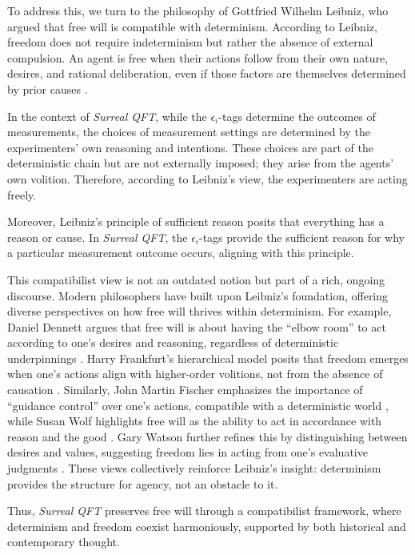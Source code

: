 \documentclass{article}
\begin{document}
To address this, we turn to the philosophy of Gottfried Wilhelm Leibniz, who argued that free will is compatible with determinism. According to Leibniz, freedom does not require indeterminism but rather the absence of external compulsion. An agent is free when their actions follow from their own nature, desires, and rational deliberation, even if those factors are themselves determined by prior causes \cite{Leibniz1686}.

In the context of \textit{Surreal QFT}, while the \(\epsilon_i\)-tags determine the outcomes of measurements, the choices of measurement settings are determined by the experimenters' own reasoning and intentions. These choices are part of the deterministic chain but are not externally imposed; they arise from the agents' own volition. Therefore, according to Leibniz's view, the experimenters are acting freely.

Moreover, Leibniz's principle of sufficient reason posits that everything has a reason or cause. In \textit{Surreal QFT}, the \(\epsilon_i\)-tags provide the sufficient reason for why a particular measurement outcome occurs, aligning with this principle.

This compatibilist view is not an outdated notion but part of a rich, ongoing discourse. Modern philosophers have built upon Leibniz's foundation, offering diverse perspectives on how free will thrives within determinism. For example, Daniel Dennett argues that free will is about having the ``elbow room'' to act according to one's desires and reasoning, regardless of deterministic underpinnings \cite{Dennett1984}. Harry Frankfurt's hierarchical model posits that freedom emerges when one's actions align with higher-order volitions, not from the absence of causation \cite{Frankfurt1971}. Similarly, John Martin Fischer emphasizes the importance of ``guidance control'' over one's actions, compatible with a deterministic world \cite{Fischer1994}, while Susan Wolf highlights free will as the ability to act in accordance with reason and the good \cite{Wolf1990}. Gary Watson further refines this by distinguishing between desires and values, suggesting freedom lies in acting from one's evaluative judgments \cite{Watson1975}. These views collectively reinforce Leibniz's insight: determinism provides the structure for agency, not an obstacle to it.

Thus, \textit{Surreal QFT} preserves free will through a compatibilist framework, where determinism and freedom coexist harmoniously, supported by both historical and contemporary thought.
\end{document}

